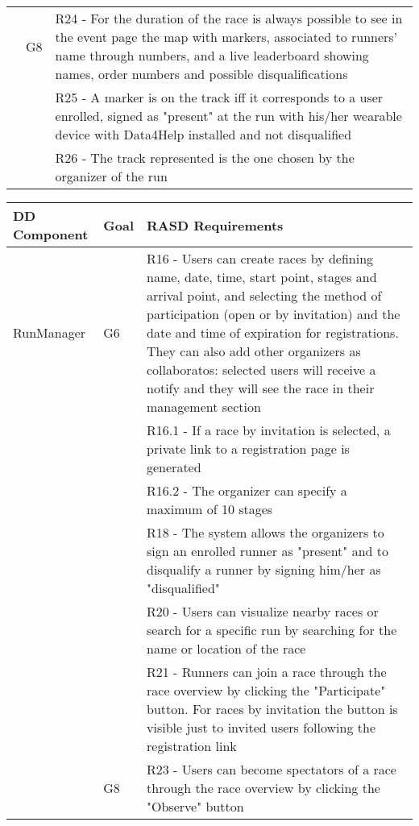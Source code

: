 \begin{table}[]
\begin{adjustbox}{width=\textwidth}
\begin{tabular}{|p{}|p{}|p{}|}
					& G8	 & R24 -	For the duration of the race is always possible to see in the event page the map with markers, associated to runners' name through numbers, and a live leaderboard showing names, order numbers and possible disqualifications \\[10pt]
					&		& R25 -	A marker is on the track iff it corresponds to a user enrolled, signed as "present" at the run with his/her wearable device with Data4Help installed and not disqualified \\[10pt]
					&		& R26 -	The track represented is the one chosen by the organizer of the run \\[10pt] \hline
\end{tabular}
\end{adjustbox}
\end{table}

\begin{table}[]
\begin{adjustbox}{width=\textwidth}
\begin{tabular}{|p{}|p{}|p{}|}
\hline
\textbf{DD Component} & \textbf{Goal} & \textbf{RASD Requirements}\\ \hline
RunManager			& G6	 & R16 -	 Users can create races by defining name, date, time, start point, stages and arrival point, and selecting the method of participation (open or by invitation) and the date and time of expiration for registrations. They can also add other organizers as collaboratos: selected users will receive a notify and they will see the race in their management section \\[10pt]
					&		& R16.1 - If a race by invitation is selected, a private link to a registration page is generated \\[10pt]
					&		& R16.2	- The organizer can specify a maximum of 10 stages \\[10pt]
					&		& R18 -	The system allows the organizers to sign an enrolled runner as "present" and to disqualify a runner by signing him/her as "disqualified" \\[10pt]
					&		& R20 -	Users can visualize nearby races or search for a specific run by searching for the name or location of the race \\[10pt]
					&		& R21 -	Runners can join a race through the race overview by clicking the "Participate" button. For races by invitation the button is visible just to invited users following the registration link \\[10pt]
					& G8	 & R23 -	 Users can become spectators of a race through the race overview by clicking the "Observe" button \\[10pt] \hline
\end{tabular}
\end{adjustbox}
\end{table}

%
